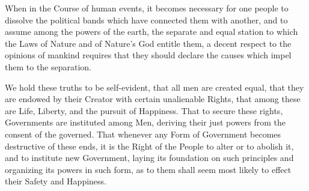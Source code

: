 %
%
%
%
%
%
When in the Course of human events, it becomes necessary for one
people
  to dissolve the political bands which have connected them with another,
  and to assume among the powers of the earth, the separate and equal station
  to which the Laws of Nature and of Nature's God entitle them, a decent
  respect to the opinions of mankind requires that they should declare
  the causes which impel them to the separation.

  We hold these truths to be self-evident, that all men are created equal,
  that they are endowed by their Creator with certain unalienable Rights,
  that among these are Life, Liberty, and the pursuit of Happiness.  That to secure these
  rights, Governments are instituted among Men, deriving their just powers
  from the consent of the governed.  That whenever any Form of Government
  becomes destructive of these ends, it is the Right of the People to alter
  or to abolish it, and to institute new Government, laying its foundation on
  such principles and organizing its powers in such form, as to them shall
  seem most likely to effect their Safety and Happiness.
